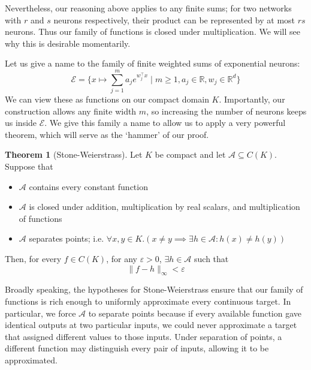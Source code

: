 \documentclass{article}
\theoremstyle{definition}
\newtheorem{theorem}{Theorem}
\begin{document}
Nevertheless, our reasoning above applies to any finite sums; for two networks with $r$ and $s$ neurons respectively, their product can be represented by at most $rs$ neurons. Thus our family of functions is closed under multiplication. We will see why this is desirable momentarily.

Let us give a name to the family of finite weighted sums of exponential neurons:
$$\mathcal{E} = \{x \mapsto \sum_{j=1}^m a_je^{w^\top_j x} \mid m \ge 1, a_j \in \mathbb{R}, w_j \in \mathbb{R}^d\}$$
We can view these as functions on our compact domain $K$. Importantly, our construction allows any finite width $m$, so increasing the number of neurons keeps us inside $\mathcal{E}$. We give this family a name to allow us to apply a very powerful theorem, which will serve as the `hammer' of our proof.

\begin{theorem}[Stone-Weierstrass]
Let $K$ be compact and let $\mathcal{A} \subseteq C(K)$. Suppose that
\begin{itemize}
    \item $\mathcal{A}$ contains every constant function
    \item $\mathcal{A}$ is closed under addition, multiplication by real scalars, and multiplication of functions
    \item $\mathcal{A}$ separates points; i.e. $\forall x, y \in K.(x \ne y \implies \exists h \in \mathcal{A} : h(x) \ne h(y))$
\end{itemize}
Then, for every $f \in C(K)$, for any $\varepsilon > 0$, $\exists h \in \mathcal{A}$ such that
$$\|f - h\|_\infty < \varepsilon$$
\end{theorem}

Broadly speaking, the hypotheses for Stone-Weierstrass ensure that our family of functions is rich enough to uniformly approximate every continuous target. In particular, we force $\mathcal{A}$ to separate points because if every available function gave identical outputs at two particular inputs, we could never approximate a target that assigned different values to those inputs. Under separation of points, a different function may distinguish every pair of inputs, allowing it to be approximated.
\end{document}
